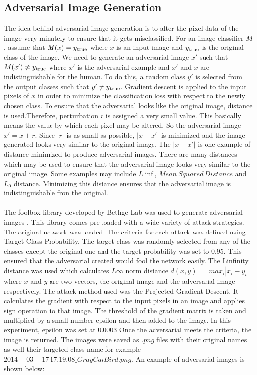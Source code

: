 \documentclass[11pt]{article}
\begin{document}
\subsection{Adversarial Image Generation}
The idea behind adversarial image generation is to alter the pixel data of the image very minutely to ensure that it gets misclassified. For an image classifier $M$, assume that $M(x) = y \textsubscript{true}$ where $x$ is an input image and $y\textsubscript{true}$ is the original class of the image. We need to generate an adversarial image $x'$ such that $M(x') \neq y\textsubscript{true}$ where $x'$ is the adversarial example and $x'$ and $x$ are indistinguishable for the human. To do this, a random class $y'$ is selected from the output classes such that $y'\neq y\textsubscript{true}$. Gradient descent is applied to the input pixels of $x$ in order to minimize the classification loss with respect to the newly chosen class. To ensure that the adversarial looks like the original image, distance is used.Therefore, perturbation $r$ is assigned a very small value. This basically means the value by which each pixel may be altered. So the adversarial image $x' = x + r$. Since $|r|$ is as small as possible, $|x-x'|$ is minimized and the image generated looks very similar to the original image. The $|x-x'|$ is one example of distance minimized to produce adversarial images. There are many distances which may be used to ensure that the adversarial image looks very similar to the original image. Some examples may include $L \inf$, $Mean \ Squared \ Distance $ and $ L_0$ distance. Minimizing this distance ensures that the adversarial image is indistinguishable fron the original.\\ \\
The foolbox library developed by Bethge Lab was used to generate adversarial images \cite{rauber2017foolbox}. This library comes pre-loaded with a wide variety of attack strategies. The original network was loaded. The criteria for each attack was defined using Target Class Probability. The target class was randomly selected from any of the classes except the original one and the target probability was set to 0.95. This ensured that the adversarial created would fool the network easily. The Linfinity distance was used which calculates $L\infty$ norm distance $d(x, y) \ = \ max_i|x_i-y_i|$ where $x$ and $y$ are two vectors, the original image and the adversarial image respectively. The attack method used was the Projected Gradient Descent. It calculates the gradient with respect to the input pixels in an image and applies sign operation to that image. The threshold of the gradient matrix is taken and multiplied by a small number epsilon and then added to the image. In this experiment, epsilon was set at $0.0003$ Once the adversarial meets the criteria, the image is returned. 
The images were saved as $.png$ files with their original names as well their targeted class name for example $2014-03-17 \ 17.19.08\_GrayCatBird.png$. An example of adversarial images is shown below:
 
\end{document}
